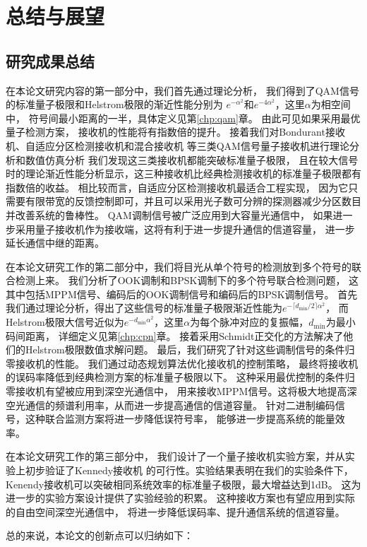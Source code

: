 \chapter{总结与展望}
\section{研究成果总结}
在本论文研究内容的第一部分中，我们首先通过理论分析，
我们得到了QAM信号的标准量子极限和Helstrom极限的渐近性能分别为
$e^{-\alpha^2}$和$e^{-4\alpha^2}$，这里$\alpha$为相空间中，
符号间最小距离的一半，具体定义见第\ref{chp:qam}章。
由此可见如果采用最优量子检测方案，
接收机的性能将有指数倍的提升。
接着我们对Bondurant接收机、自适应分区检测接收机和混合接收机
等三类QAM信号量子接收机进行理论分析和数值仿真分析
我们发现这三类接收机都能突破标准量子极限，
且在较大信号时的理论渐近性能分析显示，这三种接收机比经典检测接收机的标准量子极限都有指数倍的收益。
相比较而言，自适应分区检测接收机最适合工程实现，
因为它只需要有限带宽的反馈控制即可，并且可以采用光子数可分辨的探测器减少分区数目并改善系统的鲁棒性。
QAM调制信号被广泛应用到大容量光通信中，
如果进一步采用量子接收机作为接收端，这将有利于进一步提升通信的信道容量，
进一步延长通信中继的距离。

在本论文研究工作的第二部分中，我们将目光从单个符号的检测放到多个符号的联合检测上来。
我们分析了OOK调制和BPSK调制下的多个符号联合检测问题，
这其中包括MPPM信号、编码后的OOK调制信号和编码后的BPSK调制信号。
首先我们通过理论分析，得出了这些信号的标准量子极限渐近性能为$e^{-\lceil d_{\min}/2\rceil \alpha^2}$，
而Helstrom极限大信号近似为$e^{-d_{\min} \alpha^2}$，这里$\alpha$为每个脉冲对应的复振幅，$d_{\min}$为最小码间距离，
详细定义见第\ref{chp:cpn}章。
接着采用Schmidt正交化的方法解决了他们的Helstrom极限数值求解问题。
最后，我们研究了针对这些调制信号的条件归零接收机的性能。
我们通过动态规划算法优化接收机的控制策略，
最终将接收机的误码率降低到经典检测方案的标准量子极限以下。
这种采用最优控制的条件归零接收机有望被应用到深空光通信中，
用来接收MPPM信号。这将极大地提高深空光通信的频谱利用率，从而进一步提高通信的信道容量。
针对二进制编码信号，这种联合监测方案将进一步降低误符号率，
能够进一步提高系统的能量效率。

在本论文研究工作的第三部分中，
我们设计了一个量子接收机实验方案，并从实验上初步验证了Kennedy接收机
的可行性。实验结果表明在我们的实验条件下，
Kenendy接收机可以突破相同系统效率的标准量子极限，最大增益达到1dB。
这为进一步的实验方案设计提供了实验经验的积累。
这种接收方案也有望应用到实际的自由空间深空光通信中，
将进一步降低误码率、提升通信系统的信道容量。

总的来说，本论文的创新点可以归纳如下：

